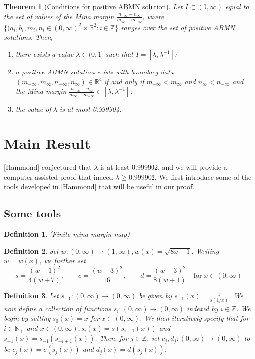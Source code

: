 \documentclass{article}
\newtheorem{theorem}{Theorem}
\newtheorem{definition}{Definition}
\begin{document}
\begin{theorem}[Conditions for positive ABMN solution]
    Let $I\subset (0,\infty)$ equal to the set of values of the Mina margin
    $\frac{n_{-\infty}-n_{\infty}}{m_{\infty}-m_{-\infty}}$, where $\{(a_i, b_i, m_i,
    n_i\in(0,\infty)^2\times \mathbb{R}^2:i\in\mathbb{Z}\}$ ranges over the set of positive ABMN
    solutions. Then,
    \begin{enumerate}
        \item there exists a value $\lambda\in(0,1]$ such that $I = [\lambda, \lambda^{-1}]$;
        \item a positive ABMN solution exists with boundary data $(m_{-\infty}, m_{\infty},
        n_{-\infty}, n_{\infty})\in\mathbb{R}^4$ if and only if $m_{-\infty}<m_{\infty}$ and
        $n_{\infty} < n_{-\infty}$ and the Mina margin
        $\frac{n_{-\infty}-n_{\infty}}{m_{\infty}-m_{-\infty}}\in[\lambda, \lambda^{-1}]$;
        \item the value of $\lambda$ is at most 0.999904.
    \end{enumerate}
\end{theorem}


\section{\centering Main Result}
[Hammond] conjectured that $\lambda$ is at least 0.999902, and we will provide a computer-assisted
proof that indeed $\lambda \geq 0.999902$. We first introduce some of the tools developed in
[Hammond] that will be useful in our proof.



\subsection{\centering Some tools}
\begin{definition}(Finite mina margin map)

\end{definition}

\begin{definition}
    Set $w:(0,\infty)\to(1,\infty), w(x)=\sqrt{8x+1}$. Writing $w=w(x)$, we further set
    $$s=\frac{(w-1)^2}{4(w+7)},\qquad c=\frac{(w+3)^2}{16}, \qquad d=\frac{(w+3)^2}{8(w+1)} \quad
    \text{for } x\in(0,\infty)$$ 
\end{definition}

\begin{definition}
    Let $s_{-1}:(0,\infty)\to(0,\infty)$ be given by $s_{-1}(x)=\frac{1}{s(1/x)}$. We now define a
    collection of functions $s_i:(0,\infty)\to(0,\infty)$ indexed by $i\in\mathbb{Z}$. We begin by
    setting $s_0(x)=x$ for $x\in(0,\infty)$. We then iteratively specify that for $i\in\mathbb{N}_+$
    and $x\in(0,\infty), s_i(x)=s(s_{i-1}(x))$ and $s_{-1}(x)=s_{-1}(s_{-i+1}(x))$. Then, for $j\in 
    \mathbb{Z}$, set $c_j, d_j:(0,\infty)\to(0,\infty)$ to be $c_j(x)=c(s_j(x))$ and
    $d_j(x)=d(s_j(x))$.
\end{definition}
\end{document}
